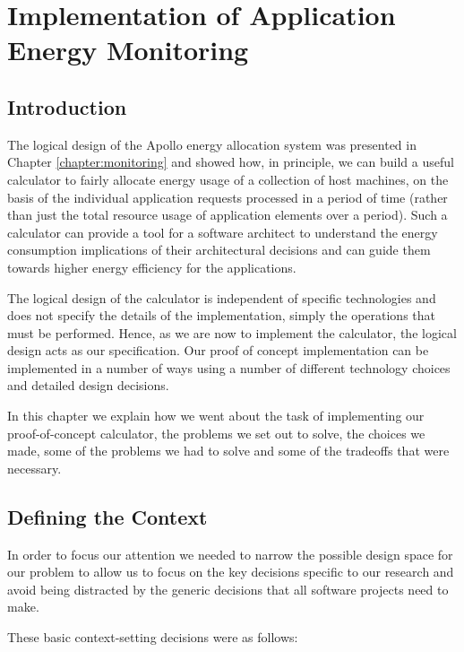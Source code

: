 \chapter{Implementation of Application Energy Monitoring}
\label{chapter:implementation}

\section{Introduction}
The logical design of the Apollo energy allocation system was presented in Chapter \ref{chapter:monitoring} and showed how, in principle, we can build a useful calculator to fairly allocate energy usage of a collection of host machines, on the basis of the individual application requests processed in a period of time (rather than just the total resource usage of application elements over a period).   Such a calculator can provide a tool for a software architect to understand the energy consumption implications of their architectural decisions and can guide them towards higher energy efficiency for the applications.

The logical design of the calculator is independent of specific technologies and does not specify the details of the implementation, simply the operations that must be performed.  Hence, as we are now to implement the calculator, the logical design acts as our specification.  Our proof of concept implementation can be implemented in a number of ways using a number of different technology choices and detailed design decisions.

In this chapter we explain how we went about the task of implementing our proof-of-concept calculator, the problems we set out to solve, the choices we made, some of the problems we had to solve and some of the tradeoffs that were necessary.

\section{Defining the Context}

In order to focus our attention we needed to narrow the possible design space for our problem to allow us to focus on the key decisions specific to our research and avoid being distracted by the generic decisions that all software projects need to make.

These basic context-setting decisions were as follows:

